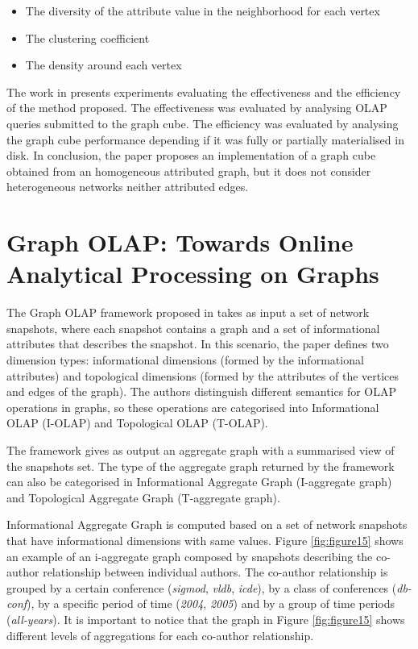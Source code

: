 \begin{itemize}
\item The diversity of the attribute value in the neighborhood for each vertex
\item The clustering coefficient
\item The density around each vertex
\end{itemize}

The work in \cite{Zhao2011} presents experiments evaluating the effectiveness and the efficiency of the method proposed. The effectiveness was evaluated by analysing OLAP queries submitted to the graph cube. The efficiency was evaluated by analysing the graph cube performance depending if it was fully or partially materialised in disk. In conclusion, the paper proposes an implementation of a graph cube obtained from an homogeneous attributed graph, but it does not consider heterogeneous networks neither attributed edges.

\section{Graph OLAP: Towards Online Analytical Processing on Graphs}

The Graph OLAP framework  proposed in \cite{Chen2008} takes as input a set of network snapshots, where each snapshot contains a graph and a set of informational attributes that describes the snapshot. In this scenario, the paper defines two dimension types: informational dimensions (formed by the informational attributes) and topological dimensions (formed by the attributes of the vertices and edges of the graph). The authors distinguish different semantics for OLAP operations in graphs, so these operations are categorised into Informational OLAP (I-OLAP) and Topological OLAP (T-OLAP).

The framework gives as output an aggregate graph with a summarised view of the snapshots set. The type of the aggregate graph returned by the framework can also be categorised in Informational Aggregate Graph (I-aggregate graph) and Topological Aggregate Graph (T-aggregate graph).

Informational Aggregate Graph is computed based on a set of network snapshots that have informational dimensions with same values. Figure \ref{fig:figure15} shows an example of an i-aggregate graph composed by snapshots describing the co-author relationship between individual authors. The co-author relationship is grouped by a certain conference (\emph{sigmod}, \emph{vldb}, \emph{icde}), by a class of conferences (\emph{db-conf}), by a specific period of time (\emph{2004}, \emph{2005}) and by a group of time periods (\emph{all-years}). It is important to notice that the graph in Figure \ref{fig:figure15} shows different levels of aggregations for each co-author relationship.


